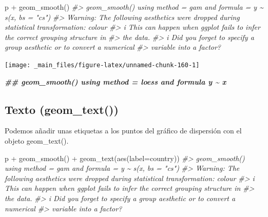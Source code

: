 \documentclass[
]{book}
\newenvironment{Shaded}{\begin{snugshade}}{\end{snugshade}}
\newcommand{\AttributeTok}[1]{\textcolor[rgb]{0.77,0.63,0.00}{#1}}
\newcommand{\CommentTok}[1]{\textcolor[rgb]{0.56,0.35,0.01}{\textit{#1}}}
\newcommand{\DocumentationTok}[1]{\textcolor[rgb]{0.56,0.35,0.01}{\textbf{\textit{#1}}}}
\newcommand{\FunctionTok}[1]{\textcolor[rgb]{0.00,0.00,0.00}{#1}}
\newcommand{\NormalTok}[1]{#1}
\newcommand{\SpecialCharTok}[1]{\textcolor[rgb]{0.00,0.00,0.00}{#1}}
\begin{document}
\begin{Shaded}
\begin{Highlighting}[]
\NormalTok{p }\SpecialCharTok{+}  \FunctionTok{geom\_smooth}\NormalTok{() }
\CommentTok{\#\textgreater{} \textasciigrave{}geom\_smooth()\textasciigrave{} using method = \textquotesingle{}gam\textquotesingle{} and formula = \textquotesingle{}y \textasciitilde{} s(x, bs = "cs")\textquotesingle{}}
\CommentTok{\#\textgreater{} Warning: The following aesthetics were dropped during statistical transformation: colour}
\CommentTok{\#\textgreater{} i This can happen when ggplot fails to infer the correct grouping structure in}
\CommentTok{\#\textgreater{}   the data.}
\CommentTok{\#\textgreater{} i Did you forget to specify a \textasciigrave{}group\textasciigrave{} aesthetic or to convert a numerical}
\CommentTok{\#\textgreater{}   variable into a factor?}
\end{Highlighting}
\end{Shaded}

\begin{center}\texttt{[image: \_main\_files/figure-latex/unnamed-chunk-160-1]} \end{center}

\begin{Shaded}
\begin{Highlighting}[]
\DocumentationTok{\#\# \textasciigrave{}geom\_smooth()\textasciigrave{} using method = \textquotesingle{}loess\textquotesingle{} and formula \textquotesingle{}y \textasciitilde{} x\textquotesingle{}}
\end{Highlighting}
\end{Shaded}

\hypertarget{texto-geom_text}{%
\subsection{Texto (geom\_text())}\label{texto-geom_text}}

Podemos añadir unas etiquetas a los puntos del gráfico de dispersión con el objeto geom\_text().

\begin{Shaded}
\begin{Highlighting}[]
\NormalTok{p }\SpecialCharTok{+}  \FunctionTok{geom\_smooth}\NormalTok{() }\SpecialCharTok{+} 
  \FunctionTok{geom\_text}\NormalTok{(}\FunctionTok{aes}\NormalTok{(}\AttributeTok{label=}\NormalTok{country))}
\CommentTok{\#\textgreater{} \textasciigrave{}geom\_smooth()\textasciigrave{} using method = \textquotesingle{}gam\textquotesingle{} and formula = \textquotesingle{}y \textasciitilde{} s(x, bs = "cs")\textquotesingle{}}
\CommentTok{\#\textgreater{} Warning: The following aesthetics were dropped during statistical transformation: colour}
\CommentTok{\#\textgreater{} i This can happen when ggplot fails to infer the correct grouping structure in}
\CommentTok{\#\textgreater{}   the data.}
\CommentTok{\#\textgreater{} i Did you forget to specify a \textasciigrave{}group\textasciigrave{} aesthetic or to convert a numerical}
\CommentTok{\#\textgreater{}   variable into a factor?}
\end{Highlighting}
\end{Shaded}
\end{document}
